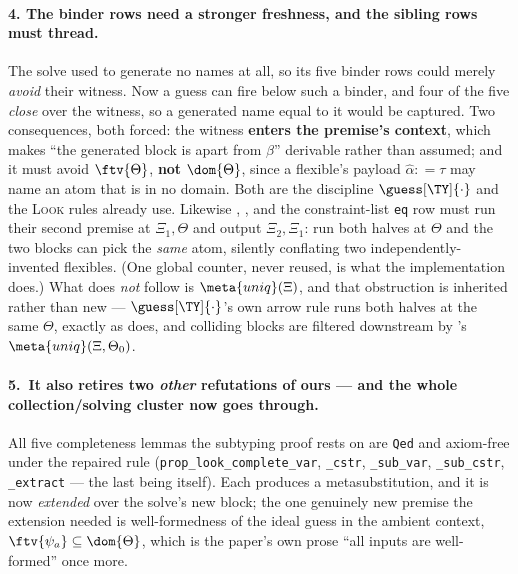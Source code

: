 \documentclass[11pt,a4paper]{article}
\theoremstyle{definition}
\newcommand{\coq}[1]{\texttt{\small #1}}
\newcommand{\uniq}[1]{\meta{uniq}(#1)}
\newcommand{\Qed}{\coq{Qed}}
\newcommand{\defeq}{\mathrel{{:}{=}}}
\begin{document}
\paragraph{4. The binder rows need a stronger freshness, and the sibling
rows must thread.}  The solve used to generate no names at all, so its five
binder rows could merely \emph{avoid} their witness.  Now a guess can fire
below such a binder, and four of the five \emph{close} over the witness, so
a generated name equal to it would be captured.  Two consequences, both
forced: the witness \textbf{enters the premise's context}, which makes
``the generated block is apart from $\beta$'' derivable rather than assumed;
and it must avoid $\ftv{\Theta}$, \textbf{not} $\dom{\Theta}$, since a
flexible's payload $\hat\alpha \defeq \tau$ may name an atom that is in no
domain.  Both are the discipline $\guess[\TY]{\cdot}$ and the \textsc{Look}
rules already use.  Likewise , ,
 and the constraint-list \texttt{eq} row must run their
second premise at $\Xi_1,\Theta$ and output $\Xi_2,\Xi_1$: run both halves
at $\Theta$ and the two blocks can pick the \emph{same} atom, silently
conflating two independently-invented flexibles.  (One global counter,
never reused, is what the implementation does.)  What does \emph{not}
follow is $\uniq{\Xi}$, and that obstruction is inherited rather than new
--- $\guess[\TY]{\cdot}$'s own arrow rule runs both halves at the same
$\Theta$, exactly as  does, and colliding blocks are filtered
downstream by 's $\uniq{\Xi,\Theta_0}$.

\paragraph{5.\ It also retires two \emph{other} refutations of ours ---
and the whole collection/solving cluster now goes through.}  All five
completeness lemmas the subtyping proof rests on are \Qed{} and axiom-free
under the repaired rule (\coq{prop\_look\_complete\_var}, \coq{\_cstr},
\coq{\_sub\_var}, \coq{\_sub\_cstr}, \coq{\_extract} --- the last being
 itself).  Each produces a metasubstitution, and it is now
\emph{extended} over the solve's new block; the one genuinely new premise
the extension needed is well-formedness of the ideal guess in the ambient
context, $\ftv{\psi_a}\subseteq\dom{\Theta}$, which is the paper's own
prose ``all inputs are well-formed'' once more.
\end{document}
